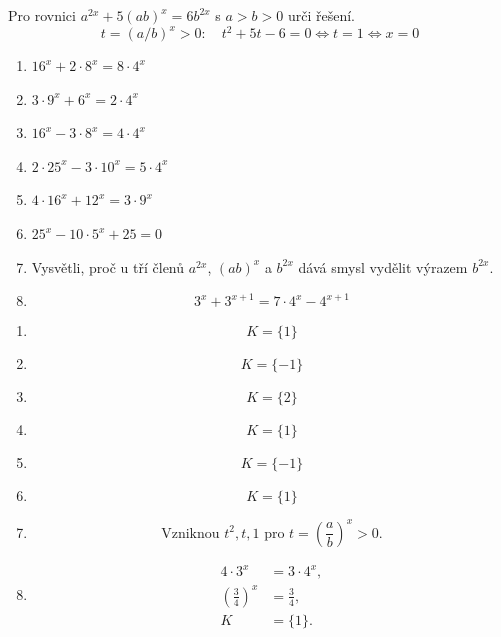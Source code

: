 \documentclass[11pt,a4paper]{article}
\begin{document}
\begin{zadaniReseniBox}[title={Rozšíření 1}]
Pro rovnici $a^{2x}+5(ab)^x=6b^{2x}$ s $a>b>0$ urči řešení.
\tcblower
\[
t=(a/b)^x>0:\quad t^2+5t-6=0\iff t=1\iff x=0
\]
\end{zadaniReseniBox}
\begin{zadaniReseniBox}[title={Domácí úkol}]
\begin{enumerate}[label=\alph*)]
\item $16^x+2\cdot8^x=8\cdot4^x$
\item $3\cdot9^x+6^x=2\cdot4^x$
\item $16^x-3\cdot8^x=4\cdot4^x$
\item $2\cdot25^x-3\cdot10^x=5\cdot4^x$
\item $4\cdot16^x+12^x=3\cdot9^x$
\item $25^x-10\cdot5^x+25=0$
\item Vysvětli, proč u tří členů $a^{2x}$, $(ab)^x$ a $b^{2x}$ dává smysl vydělit výrazem $b^{2x}$.
\item \[ 3^x+3^{x+1}=7\cdot4^x-4^{x+1} \]
\end{enumerate}
\tcblower
\setlength{\abovedisplayskip}{2pt}\setlength{\belowdisplayskip}{2pt}
\setlength{\abovedisplayshortskip}{2pt}\setlength{\belowdisplayshortskip}{2pt}
\begin{enumerate}[label=\alph*)]
\item \[K=\{1\}\]
\item \[K=\{-1\}\]
\item \[K=\{2\}\]
\item \[K=\{1\}\]
\item \[K=\{-1\}\]
\item \[K=\{1\}\]
\item \[\text{Vzniknou }t^2,t,1\text{ pro }t=\left(\frac ab\right)^x>0.\]
\item \[\begin{aligned}4\cdot3^x&=3\cdot4^x,\\\left(\frac{3}{4}\right)^x&=\frac{3}{4},\\K&=\{1\}.\end{aligned}\]
\end{enumerate}
\end{zadaniReseniBox}
\end{document}
